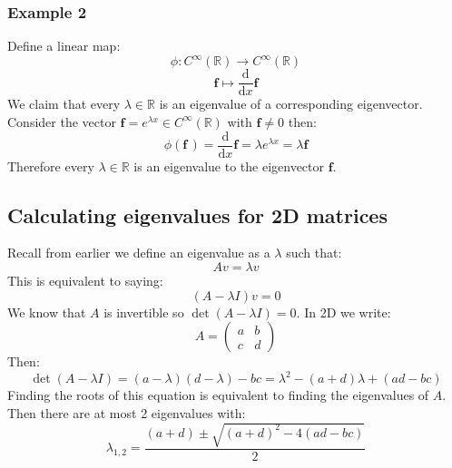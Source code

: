 \documentclass[12pt]{article}
\newcommand{\df}[2]{\frac{\text{d}#1}{\text{d}#2}}
\begin{document}
\subsubsection*{Example 2}
Define a linear map:
\[\phi:C^\infty(\mathbb{R})\to C^\infty(\mathbb{R})\]
\[\textbf{f}\mapsto \df{}{x}\textbf{f}\]
We claim that every \(\lambda\in \mathbb{R}\) is an eigenvalue of a corresponding eigenvector. Consider the vector \(\textbf{f}=e^{\lambda x}\in C^\infty(\mathbb{R})\) with \(\textbf{f}\ne 0\) then:
\[\phi(\textbf{f}\,)=\df{}{x}\textbf{f}=\lambda e^{\lambda x}=\lambda \textbf{f}\]
Therefore every \(\lambda\in \mathbb{R}\) is an eigenvalue to the eigenvector \(\textbf{f}\).
\subsection*{Calculating eigenvalues for 2D matrices}
Recall from earlier we define an eigenvalue as a \(\lambda\) such that:
\[Av=\lambda v\]
This is equivalent to saying:
\[(A-\lambda I)v=0\]
We know that \(A\) is invertible so \(\det(A-\lambda I)=0\). In 2D we write:
\[A=\begin{pmatrix}
    a & b \\
    c & d
\end{pmatrix}\]
Then:
\[\det(A-\lambda I)=(a-\lambda)(d-\lambda)-bc=\lambda^2-(a+d)\lambda+(ad-bc)\]
Finding the roots of this equation is equivalent to finding the eigenvalues of \(A\). Then there are at most 2 eigenvalues with:
\[\lambda_{1,2}=\frac{(a+d)\pm\sqrt{(a+d)^2-4(ad-bc)}}{2}\]
\end{document}
